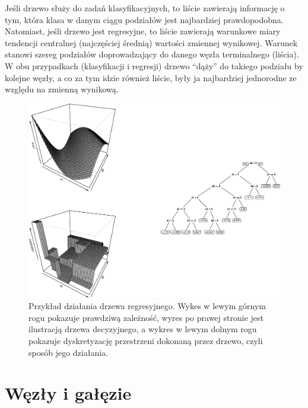 \documentclass[
]{book}
\theoremstyle{plain}
\theoremstyle{definition}
\theoremstyle{definition}
\theoremstyle{definition}
\theoremstyle{definition}
\theoremstyle{remark}
\begin{document}
Jeśli drzewo służy do zadań klasyfikacyjnych, to liście zawierają informację o tym, która klasa w danym ciągu podziałów jest najbardziej prawdopodobna. Natomiast, jeśli drzewo jest regresyjne, to liście zawierają warunkowe miary tendencji centralnej (najczęściej średnią) wartości zmiennej wynikowej. Warunek stanowi szereg podziałów doprowadzający do danego węzła terminalnego (liścia). W obu przypadkach (klasyfikacji i regresji) drzewo ``dąży'' do takiego podziału by kolejne węzły, a co za tym idzie również liście, były ja najbardziej jednorodne ze względu na zmienną wynikową.

\begin{figure}
\centering
\includegraphics{EksploracjaDanych_files/figure-latex/unnamed-chunk-11-1.pdf}
\caption{\label{fig:unnamed-chunk-11}Przykład działania drzewa regresyjnego. Wykes w lewym górnym rogu pokazuje prawdziwą zależność, wyres po prawej stronie jest ilustracją drzewa decyzyjnego, a wykres w lewym dolnym rogu pokazuje dyskretyzację przestrzeni dokonaną przez drzewo, czyli sposób jego działania.}
\end{figure}

\hypertarget{wux119zux142y-i-gaux142ux119zie}{%
\section{Węzły i gałęzie}\label{wux119zux142y-i-gaux142ux119zie}}
\end{document}
